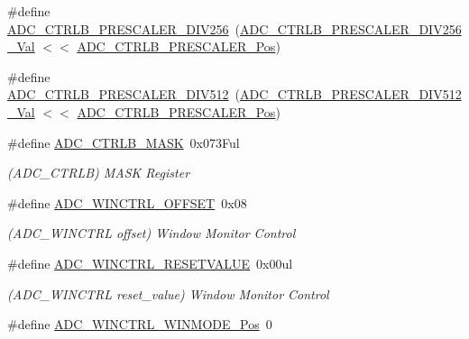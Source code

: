 \begin{DoxyCompactItemize}
\item 
\#define \mbox{\hyperlink{group___s_a_m_d21___a_d_c_ga5c9e7c35c7ad9032ce0ed62fabb90b83}{A\+D\+C\+\_\+\+C\+T\+R\+L\+B\+\_\+\+P\+R\+E\+S\+C\+A\+L\+E\+R\+\_\+\+D\+I\+V256}}~(\mbox{\hyperlink{group___s_a_m_d21___a_d_c_gaf654c74504398792bf66d522f00673fa}{A\+D\+C\+\_\+\+C\+T\+R\+L\+B\+\_\+\+P\+R\+E\+S\+C\+A\+L\+E\+R\+\_\+\+D\+I\+V256\+\_\+\+Val}} $<$$<$ \mbox{\hyperlink{group___s_a_m_d21___a_d_c_ga67bbef18402c0d73dcc1698fa185ab76}{A\+D\+C\+\_\+\+C\+T\+R\+L\+B\+\_\+\+P\+R\+E\+S\+C\+A\+L\+E\+R\+\_\+\+Pos}})
\item 
\#define \mbox{\hyperlink{group___s_a_m_d21___a_d_c_gafb676077401ba90f03bbf2560f3f16a3}{A\+D\+C\+\_\+\+C\+T\+R\+L\+B\+\_\+\+P\+R\+E\+S\+C\+A\+L\+E\+R\+\_\+\+D\+I\+V512}}~(\mbox{\hyperlink{group___s_a_m_d21___a_d_c_ga95ad89ae1a278d5beaec0363f3492dd2}{A\+D\+C\+\_\+\+C\+T\+R\+L\+B\+\_\+\+P\+R\+E\+S\+C\+A\+L\+E\+R\+\_\+\+D\+I\+V512\+\_\+\+Val}} $<$$<$ \mbox{\hyperlink{group___s_a_m_d21___a_d_c_ga67bbef18402c0d73dcc1698fa185ab76}{A\+D\+C\+\_\+\+C\+T\+R\+L\+B\+\_\+\+P\+R\+E\+S\+C\+A\+L\+E\+R\+\_\+\+Pos}})
\item 
\#define \mbox{\hyperlink{group___s_a_m_d21___a_d_c_ga6faca029aa90801c148382cd602fd85c}{A\+D\+C\+\_\+\+C\+T\+R\+L\+B\+\_\+\+M\+A\+SK}}~0x073\+Ful
\begin{DoxyCompactList}\small\item\em (A\+D\+C\+\_\+\+C\+T\+R\+LB) M\+A\+SK Register \end{DoxyCompactList}\item 
\#define \mbox{\hyperlink{group___s_a_m_d21___a_d_c_ga446df22b85afc265c9e423de8453fb51}{A\+D\+C\+\_\+\+W\+I\+N\+C\+T\+R\+L\+\_\+\+O\+F\+F\+S\+ET}}~0x08
\begin{DoxyCompactList}\small\item\em (A\+D\+C\+\_\+\+W\+I\+N\+C\+T\+RL offset) Window Monitor Control \end{DoxyCompactList}\item 
\#define \mbox{\hyperlink{group___s_a_m_d21___a_d_c_gafcfea249a8f62849ef999ac7cabb085c}{A\+D\+C\+\_\+\+W\+I\+N\+C\+T\+R\+L\+\_\+\+R\+E\+S\+E\+T\+V\+A\+L\+UE}}~0x00ul
\begin{DoxyCompactList}\small\item\em (A\+D\+C\+\_\+\+W\+I\+N\+C\+T\+RL reset\+\_\+value) Window Monitor Control \end{DoxyCompactList}\item 
\#define \mbox{\hyperlink{group___s_a_m_d21___a_d_c_ga5c7a53123f9ec54b3295fc3850240fff}{A\+D\+C\+\_\+\+W\+I\+N\+C\+T\+R\+L\+\_\+\+W\+I\+N\+M\+O\+D\+E\+\_\+\+Pos}}~0

\end{DoxyCompactItemize}
